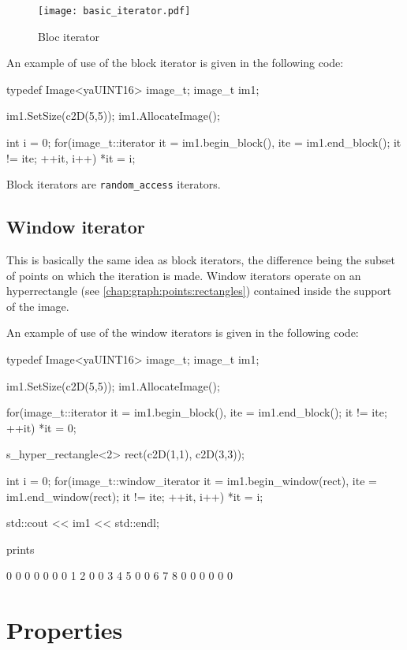 \begin{figure}[htb]
\begin{center}
   \texttt{[image: basic\_iterator.pdf]}
   \caption{Bloc iterator}
   \label{fig:image_basic_iterator}
\end{center}
\end{figure}

An example of use of the block iterator is given in the following code:
\begin{cpp}
typedef Image<yaUINT16> image_t;
image_t im1;
  
im1.SetSize(c2D(5,5));
im1.AllocateImage();
  
int i = 0;
for(image_t::iterator it = im1.begin_block(), ite = im1.end_block(); 
    it != ite; 
    ++it, i++) {
  *it = i;
}
\end{cpp}

Block iterators are \lstinline|random_access| iterators.

\subsection{Window iterator}
\label{sub:window}
This is basically the same idea as block iterators, the difference being the subset of points on which the iteration is made. Window iterators operate on an hyperrectangle (see \ref{chap:graph:points:rectangles}) contained inside the support of the image.


An example of use of the window iterators is given in the following code:
\begin{cpp}
typedef Image<yaUINT16> image_t;
image_t im1;

im1.SetSize(c2D(5,5));
im1.AllocateImage();

for(image_t::iterator it = im1.begin_block(), ite = im1.end_block(); it != ite; ++it)
  *it = 0;

s_hyper_rectangle<2> rect(c2D(1,1), c2D(3,3));
  
int i = 0;
for(image_t::window_iterator it = im1.begin_window(rect), ite = im1.end_window(rect); 
    it != ite; 
    ++it, i++) {
  *it = i;
}

std::cout << im1 << std::endl;
\end{cpp}

prints
\begin{cpp}
0 0 0 0 0
0 0 1 2 0
0 3 4 5 0
0 6 7 8 0
0 0 0 0 0
\end{cpp}



\section{Properties}
\label{sec:image_properties}

